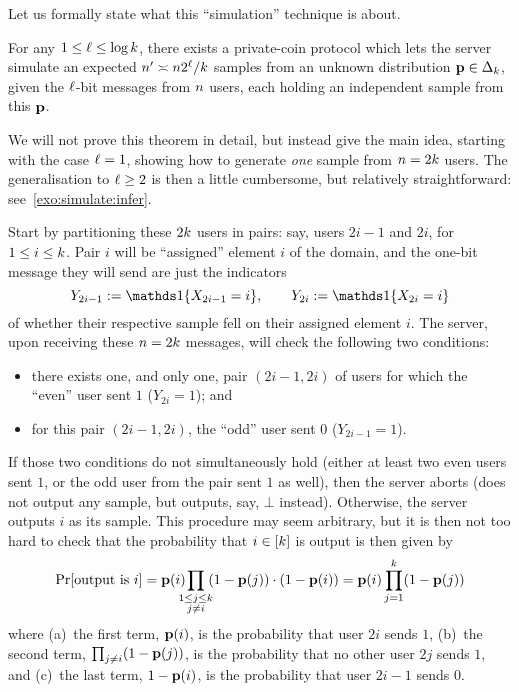 \noindent Let us formally state what this ``simulation'' technique is about.
\begin{theorem}
	\label{theo:simulate:infer}
For any $1\leq \ell \leq \log k$, there exists a private-coin protocol which lets the server simulate an expected $n' \asymp n 2^\ell/k$ \iid samples from an unknown distribution $\mathbf{p}\in\Delta_{k}$, given the $\ell$-bit messages from $n$ users, each holding an independent sample from this $\mathbf{p}$.
\end{theorem}

We will not prove this theorem in detail, but instead give the main idea, starting with the case $\ell=1$, showing how to generate \emph{one} sample from $n=2k$ users. The generalisation to $\ell\geq 2$ is then a little cumbersome, but relatively straightforward: see~\cref{exo:simulate:infer}. 

Start by partitioning these $2k$ users in pairs: say, users $2i-1$ and $2i$, for $1\leq i\leq k$. Pair $i$ will be ``assigned'' element $i$ of the domain, and the one-bit message they will send are just the indicators
\[
	Y_{2i-1} \eqdef \indic{X_{2i-1}=i}, \qquad Y_{2i} \eqdef \indic{X_{2i}=i}
\]
of whether their respective sample fell on their assigned element $i$. The server, upon receiving these $n=2k$ messages, will check the following two conditions:
\begin{itemize}
	\item there exists one, and only one, pair $(2i-1,2i)$ of users for which the ``even'' user sent $1$ ($Y_{2i}=1$); and
	\item for this pair $(2i-1,2i)$, the ``odd'' user sent $0$ ($Y_{2i-1}=1$).
\end{itemize}
If those two conditions do not simultaneously hold (either at least two even users sent $1$, or the odd user from the pair sent $1$ as well), then the server aborts (does not output any sample, but outputs, say, $\bot$ instead). Otherwise, the server outputs $i$ as its sample. This procedure may seem arbitrary, but it is then not too hard to check that the probability that $i\in[k]$ is output is then given by
\begin{equation}
	\label{eq:simulate:infer:babyversion}
	\bPr{ \text{output is } i } = \p(i)\!\!\!\!\prod_{\substack{1\leq j\leq \ab\\j\neq i}} \!\!(1-\p(j)) \cdot (1-\p(i))
	= \p(i)\prod_{j=1}^\ab (1-\p(j))
\end{equation}
where (a)~the first term, $\mathbf{p}(i)$, is the probability that user $2i$ sends $1$, (b)~the second term, $\prod_{j\neq i} (1-\mathbf{p}(j))$, is the probability that no other user $2j$ sends $1$, and (c)~the last term, $1-\mathbf{p}(i)$, is the probability that user $2i-1$ sends $0$.

